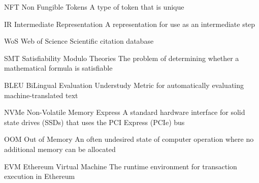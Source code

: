 




  {NFT}            %
  {Non Fungible Tokens}  %
  {A type of token that is unique} %

  {IR}            %
  {Intermediate Representation}  %
  {A representation for use as an intermediate step} %
  
  {WoS}            %
  {Web of Science}  %
  {Scientific citation database} %
  
  {SMT}            %
  {Satisfiability Modulo Theories}  %
  {The problem of determining whether a mathematical formula is satisfiable} %

  {BLEU}            %
  {BiLingual Evaluation Understudy}  %
  {Metric for automatically evaluating machine-translated text} %

  {NVMe}            %
  {Non-Volatile Memory Express}  %
  {A standard hardware interface for solid state drives (SSDs) that uses the PCI Express (PCIe) bus} %
  
  {OOM}            %
  {Out of Memory}  %
  {An often undesired state of computer operation where no additional memory can be allocated} %

  {EVM}            %
  {Ethereum Virtual Machine}  %
  {The runtime environment for transaction execution in Ethereum} %

